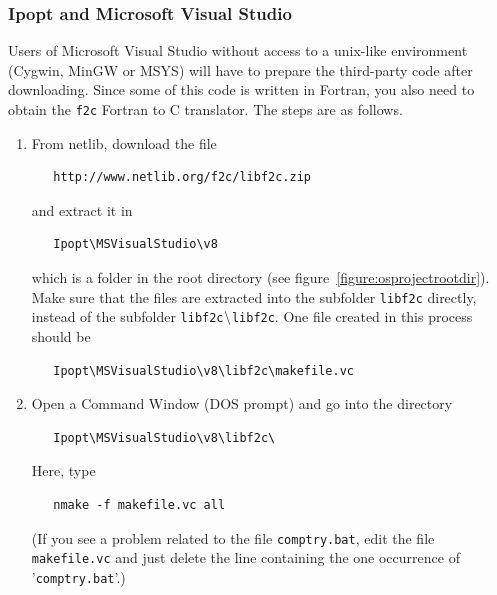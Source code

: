\documentclass[11pt]{article}
\renewcommand{\_}{{\char"5F}}
\renewcommand{\{}{{\char"7B}}
\renewcommand{\}}{{\char"7D}}
\renewcommand{\^}{{\char"0D}}
\renewcommand{\'}{{\char"0D}}
\newif\ifipopt  \ipopttrue      %
\begin{document}
\vskip 8pt

\ifipopt
\subsubsection{Ipopt and Microsoft Visual Studio} \label{section:ipopt-msvs}

Users of Microsoft Visual Studio without access to a unix-like environment (Cygwin, MinGW or MSYS) 
will have to prepare the third-party code after downloading. Since some of this code is written in Fortran,
you also need to obtain the {\tt f2c} Fortran to C translator. The steps are as follows.

\begin{enumerate}


\item{} From netlib, download the file

\begin{verbatim}
   http://www.netlib.org/f2c/libf2c.zip
\end{verbatim}

   and extract it in

\begin{verbatim}
   Ipopt\MSVisualStudio\v8
\end{verbatim}
 which is a folder in the root directory (see figure~\ref{figure:osprojectrootdir}). Make sure that the files
are extracted into the subfolder {\tt libf2c} directly, instead of the subfolder {\tt libf2c$\tt\backslash$libf2c}. 
One file created in this process should be

\begin{verbatim}
   Ipopt\MSVisualStudio\v8\libf2c\makefile.vc
\end{verbatim}


\item{} Open a Command Window (DOS prompt) and go into the directory

\begin{verbatim}   
   Ipopt\MSVisualStudio\v8\libf2c\
\end{verbatim}

   Here, type

\begin{verbatim}   
   nmake -f makefile.vc all
\end{verbatim}

   (If you see a problem related to the file {\tt comptry.bat}, edit the
   file {\tt makefile.vc} and just delete the line containing the one occurrence of
   '{\tt comptry.bat}'.)


\end{enumerate}
\end{document}
